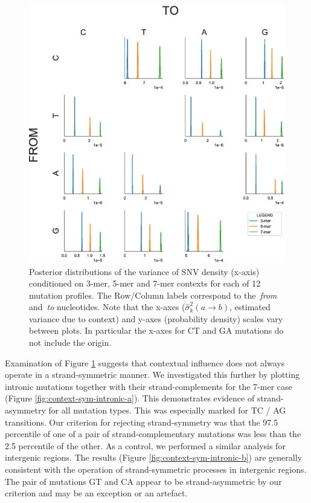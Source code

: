 \begin{figure}[]
\begin{center}
\includegraphics[width=1.0\textwidth]{figs/context-var-individual_200.eps}
\caption{Posterior distributions of the variance of SNV density (x-axis) conditioned on 3-mer, 5-mer and 7-mer contexts for each of 12 mutation profiles. The Row/Column labels correspond to the~\emph{from} and~\emph{to} nucleotides. Note that the x-axes ($\hat\sigma^2_k (a \rightarrow b)$, estimated variance due to context) and y-axes (probability density) scales vary between plots. In particular the x-axes for C\textrightarrow T and G\textrightarrow A mutations do not include the origin.}
\label{fig:context-var-individual}
\end{center}
\end{figure}

Examination of Figure \ref{fig:context-var-individual} suggests that contextual influence does not always operate in a strand-symmetric manner. We investigated this further by plotting intronic mutations together with their strand-complements for the 7-mer case (Figure \ref{fig:context-sym-intronic-a}). This demonstrates evidence of strand-asymmetry for all mutation types. This was especially marked for T\textrightarrow C / A\textrightarrow G transitions. Our criterion for rejecting strand-symmetry was that the 97.5 percentile of one of a pair of strand-complementary mutations was less than the 2.5 percentile of the other. As a control, we performed a similar analysis for intergenic regions. The results (Figure \ref{fig:context-sym-intronic-b}) are generally consistent with the operation of strand-symmetric processes in intergenic regions. The pair of mutations G\textrightarrow T and C\textrightarrow A appear to be strand-asymmetric by our criterion and may be an exception or an artefact.

